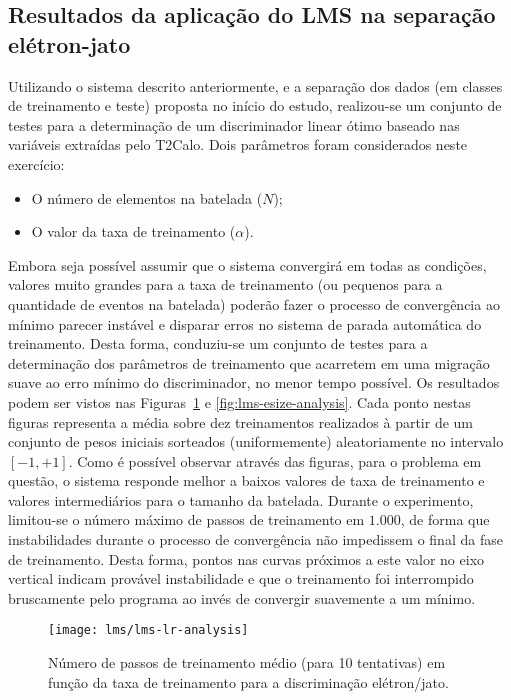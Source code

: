 \subsection{Resultados da aplicação do LMS na separação e\-lé\-tron-jato}

Utilizando o sistema descrito anteriormente, e a separação dos dados (em
classes de treinamento e teste) proposta no início do estudo, realizou-se um
conjunto de testes para a determinação de um discriminador linear ótimo
baseado nas variáveis extraídas pelo T2Calo. Dois parâmetros foram
considerados neste exercício:

\begin{itemize}
\item O número de elementos na batelada ($N$);
\item O valor da taxa de treinamento ($\alpha$).
\end{itemize}

Embora seja possível assumir que o sistema convergirá em todas as condições,
valores muito grandes para a taxa de treinamento (ou pequenos para a
quantidade de eventos na batelada) poderão fazer o processo de convergência ao
mínimo parecer instável e disparar erros no sistema de parada automática do
treinamento. Desta forma, conduziu-se um conjunto de testes para a
determinação dos parâmetros de treinamento que acarretem em uma migração suave
ao erro mínimo do discriminador, no menor tempo possível. Os resultados podem
ser vistos nas Figuras~\ref{fig:lms-lr-analysis} e
\ref{fig:lms-esize-analysis}. Cada ponto nestas figuras representa a média
sobre dez treinamentos realizados à partir de um conjunto de pesos iniciais
sorteados (uniformemente) aleatoriamente no intervalo $[-1, +1]$. Como é
possível observar através das figuras, para o problema em questão, o sistema
responde melhor a baixos valores de taxa de treinamento e valores
intermediários para o tamanho da batelada. Durante o experimento, limitou-se o
número máximo de passos de treinamento em $1.000$, de forma que instabilidades
durante o processo de convergência não impedissem o final da fase de
treinamento. Desta forma, pontos nas curvas próximos a este valor no eixo
vertical indicam provável instabilidade e que o treinamento foi interrompido
bruscamente pelo programa ao invés de convergir suavemente a um mínimo.

\begin{figure}
\begin{center}
\texttt{[image: lms/lms-lr-analysis]}
\end{center}
\caption{Número de passos de treinamento médio (para 10 tentativas) em função
da taxa de treinamento para a discriminação elétron/jato.}
\label{fig:lms-lr-analysis}
\end{figure}

